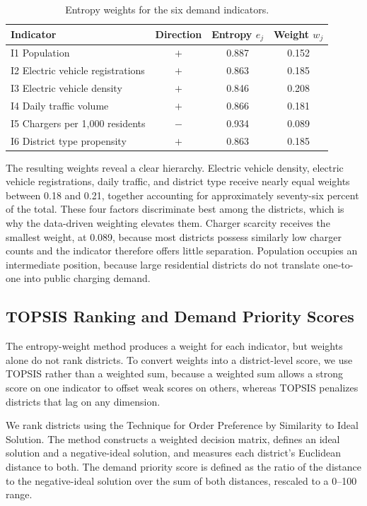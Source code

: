 \documentclass[11pt]{article}
\begin{document}
\begin{table}[H]
\centering
\caption{Entropy weights for the six demand indicators.}
\label{tab:weights}
\begin{tabular}{lccc}
\toprule
Indicator & Direction & Entropy $e_j$ & Weight $w_j$ \\
\midrule
I1 Population & $+$ & 0.887 & 0.152 \\
I2 Electric vehicle registrations & $+$ & 0.863 & 0.185 \\
I3 Electric vehicle density & $+$ & 0.846 & 0.208 \\
I4 Daily traffic volume & $+$ & 0.866 & 0.181 \\
I5 Chargers per 1{,}000 residents & $-$ & 0.934 & 0.089 \\
I6 District type propensity & $+$ & 0.863 & 0.185 \\
\bottomrule
\end{tabular}
\end{table}

The resulting weights reveal a clear hierarchy. Electric vehicle density, electric vehicle registrations, daily traffic, and district type receive nearly equal weights between 0.18 and 0.21, together accounting for approximately seventy-six percent of the total. These four factors discriminate best among the districts, which is why the data-driven weighting elevates them. Charger scarcity receives the smallest weight, at 0.089, because most districts possess similarly low charger counts and the indicator therefore offers little separation. Population occupies an intermediate position, because large residential districts do not translate one-to-one into public charging demand.

\subsection{TOPSIS Ranking and Demand Priority Scores}

The entropy-weight method produces a weight for each indicator, but weights alone do not rank districts. To convert weights into a district-level score, we use TOPSIS rather than a weighted sum, because a weighted sum allows a strong score on one indicator to offset weak scores on others, whereas TOPSIS penalizes districts that lag on any dimension. 

We rank districts using the Technique for Order Preference by Similarity to Ideal Solution. The method constructs a weighted decision matrix, defines an ideal solution and a negative-ideal solution, and measures each district's Euclidean distance to both. The demand priority score is defined as the ratio of the distance to the negative-ideal solution over the sum of both distances, rescaled to a 0--100 range.
\end{document}
